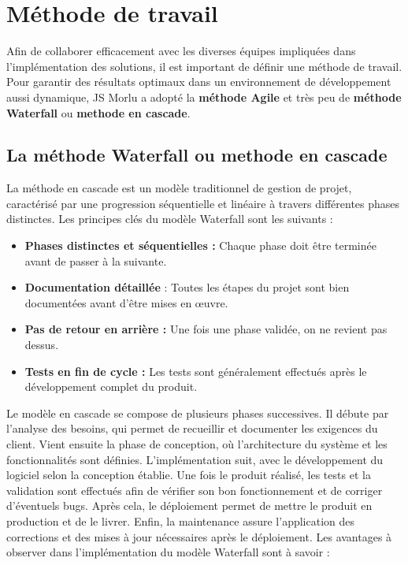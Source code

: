 {\section{Méthode de travail}

Afin de collaborer efficacement avec les diverses équipes impliquées dans l'implémentation des solutions, il est important de définir une méthode de travail. Pour garantir des résultats optimaux dans un environnement de développement aussi dynamique, JS Morlu a adopté la \textbf{méthode Agile} et très peu de \textbf{méthode Waterfall} ou \textbf{methode en cascade}. 

\subsection*{La méthode Waterfall ou methode en cascade}
La méthode en cascade est un modèle traditionnel de gestion de projet, caractérisé par une progression séquentielle et linéaire à travers différentes phases distinctes. Les principes clés du modèle Waterfall sont les suivants :

\vspace{0.3cm}

\begin{itemize}
    \item \textbf{Phases distinctes et séquentielles :} Chaque phase doit être terminée avant de passer à la suivante.
    \item \textbf{Documentation détaillée }: Toutes les étapes du projet sont bien documentées avant d’être mises en œuvre.
    \item \textbf{Pas de retour en arrière :} Une fois une phase validée, on ne revient pas dessus.
    \item \textbf{Tests en fin de cycle :} Les tests sont généralement effectués après le développement complet du produit.
\end{itemize}

\vspace{0.3cm}

Le modèle en cascade se compose de plusieurs phases successives. Il débute par l'analyse des besoins, qui permet de recueillir et documenter les exigences du client. Vient ensuite la phase de conception, où l'architecture du système et les fonctionnalités sont définies. L’implémentation suit, avec le développement du logiciel selon la conception établie. Une fois le produit réalisé, les tests et la validation sont effectués afin de vérifier son bon fonctionnement et de corriger d’éventuels bugs. Après cela, le déploiement permet de mettre le produit en production et de le livrer. Enfin, la maintenance assure l’application des corrections et des mises à jour nécessaires après le déploiement. Les avantages à observer dans l'implémentation du modèle Waterfall sont à savoir : 

}
